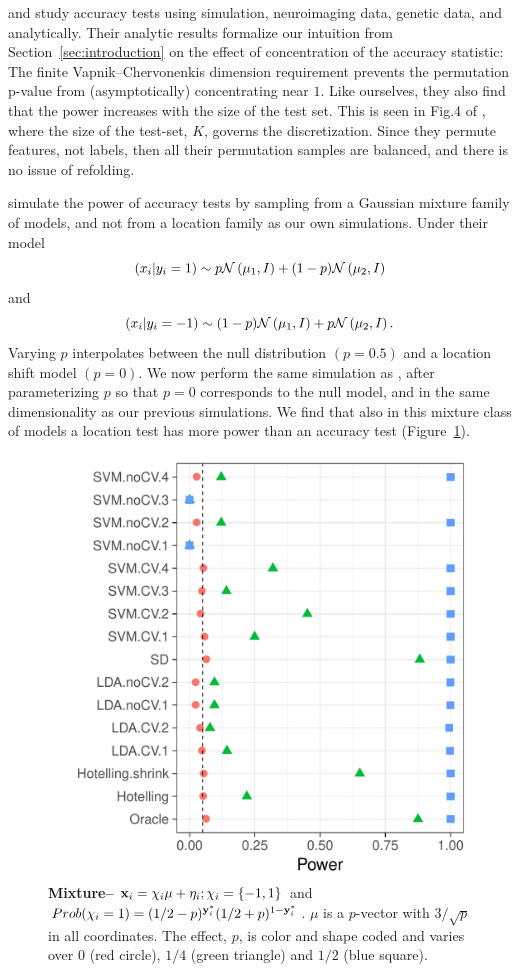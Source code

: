 \documentclass[12pt,a4paper]{article}
\begin{document}
\cite{golland_permutation_2003} and \cite{golland_permutation_2005} study accuracy tests using simulation, neuroimaging data, genetic data, and analytically.
Their analytic results formalize our intuition from Section~\ref{sec:introduction} on the effect of concentration of the accuracy statistic:
The finite Vapnik–Chervonenkis dimension requirement \citep[Sec 4.3]{golland_permutation_2005} prevents the permutation p-value from (asymptotically) concentrating near $1$. 
Like ourselves, they also find that the power increases with the size of the test set. 
This is seen in Fig.4 of \citet{golland_permutation_2005}, where the size of the test-set, $K$, governs the discretization. 
Since they permute features, not labels, then all their permutation samples are balanced, and there is no issue of refolding. 

\cite{golland_permutation_2005} simulate the power of accuracy tests by sampling from a Gaussian mixture family of models, and not from a location family as our own simulations. 
Under their model 
$$(x_i|y_i=1) \sim p \mathcal{N}\left(\mu_1,I\right)+ (1-p) \mathcal{N}\left(\mu_2,I\right)$$ 
and 
$$(x_i|y_i=-1) \sim (1-p) \mathcal{N}\left(\mu_1,I\right)+ p \mathcal{N}\left(\mu_2,I\right).$$
Varying $p$ interpolates between the null distribution $(p=0.5)$ and a location shift model $(p=0)$. 
We now perform the same simulation as \cite{golland_permutation_2005}, after parameterizing $p$ so that $p=0$ corresponds to the null model, and in the same dimensionality as our previous simulations.
We find that also in this mixture class of models a location test has more power than an accuracy test (Figure~\ref{fig:golland}).



\begin{figure}[ht]
\centering
	  \includegraphics[width=0.7\linewidth]{"art/file12"}
	  \caption{\textbf{Mixture--} $\mathbf{x}_i = \chi_i \mu + \eta_i; \chi_i = \{ -1,1 \}$ and $Prob( \chi_i=1 )=(1/2-p)^{\mathbf{y}^*_i}  (1/2+p)^{1-\mathbf{y}^*_i}$. $\mu$ is a $p$-vector with $3/\sqrt{p}$ in all coordinates.
	  The effect, $p$, is color and shape coded and varies over $0$ (red circle), $1/4$ (green triangle) and $1/2$ (blue square). }
	\label{fig:golland}
\end{figure}
\end{document}
